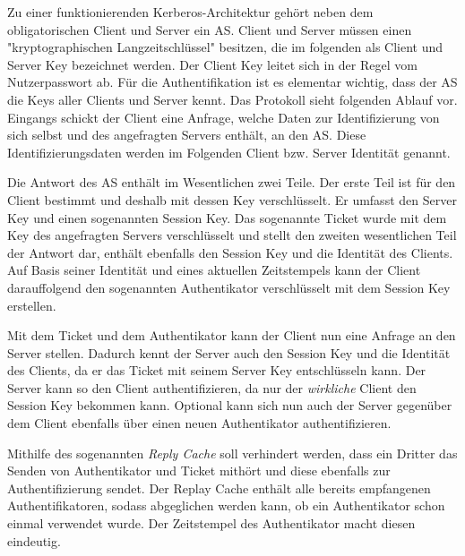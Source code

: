 Zu einer funktionierenden Kerberos-Architektur gehört neben dem obligatorischen Client und Server ein \ac{AS}.
Client und Server müssen einen "kryptographischen Langzeitschlüssel" besitzen, \cite[S. 65]{Prohl.2011} die im folgenden als Client und Server Key bezeichnet werden. Der Client Key leitet sich in der Regel vom Nutzerpasswort ab. \cite[S. 66]{Prohl.2011} Für die Authentifikation ist es elementar wichtig, dass der \ac{AS} die Keys aller Clients und Server kennt. \cite{Kohl.September1993} Das Protokoll sieht folgenden Ablauf vor. Eingangs schickt der Client eine Anfrage, welche Daten zur Identifizierung von sich selbst und des angefragten Servers enthält, an den \ac{AS}. Diese Identifizierungsdaten werden im Folgenden Client bzw. Server Identität genannt.

Die Antwort des \ac{AS} enthält im Wesentlichen zwei Teile. 
Der erste Teil ist für den Client bestimmt und deshalb mit dessen Key verschlüsselt. Er umfasst den Server Key und einen sogenannten Session Key. 
Das sogenannte Ticket wurde mit dem Key des angefragten Servers verschlüsselt und stellt den zweiten wesentlichen Teil der Antwort dar, enthält ebenfalls den Session Key und die Identität des Clients.
Auf Basis seiner Identität und eines aktuellen Zeitstempels kann der Client darauffolgend den sogenannten Authentikator verschlüsselt mit dem Session Key erstellen. \cite{Kohl.September1993}

Mit dem Ticket und dem Authentikator kann der Client nun eine Anfrage an den Server stellen. Dadurch kennt der Server auch den Session Key und die Identität des Clients, da er das Ticket mit seinem Server Key entschlüsseln kann. Der Server kann so den Client authentifizieren, da nur der \emph{wirkliche} Client den Session Key bekommen kann. Optional kann sich nun auch der Server gegenüber dem Client ebenfalls über einen neuen Authentikator authentifizieren. \cite[S. 69-70]{Prohl.2011}

Mithilfe des sogenannten \emph{Reply Cache} soll verhindert werden, dass ein Dritter das Senden von Authentikator und Ticket mithört und diese ebenfalls zur Authentifizierung sendet. Der Replay Cache enthält alle bereits empfangenen Authentifikatoren, sodass abgeglichen werden kann, ob ein Authentikator schon einmal verwendet wurde. \cite[S. 70]{Prohl.2011} Der Zeitstempel des Authentikator macht diesen eindeutig.

